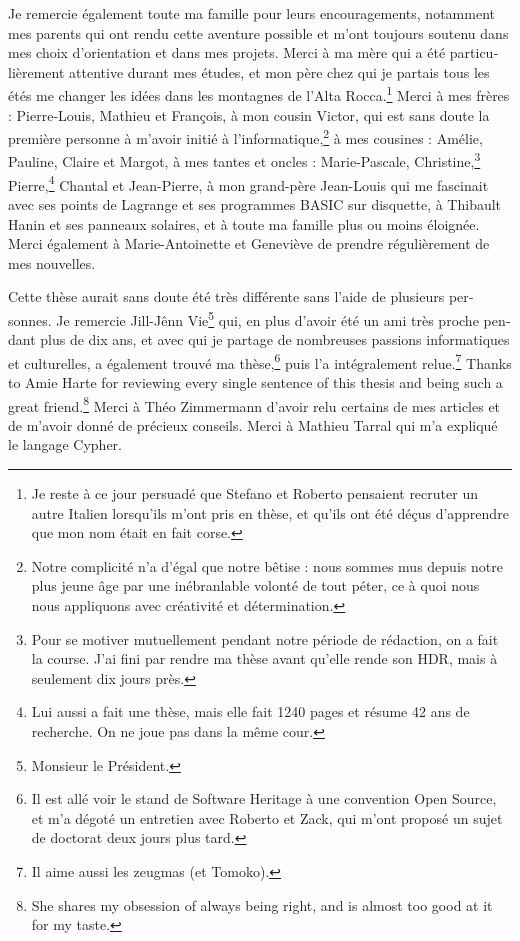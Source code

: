 \begin{otherlanguage}{french}
\begin{SingleSpace}
  Je remercie également toute ma famille pour leurs encouragements, notamment
  mes parents qui ont rendu cette aventure possible et m'ont toujours soutenu
  dans mes choix d'orientation et dans mes projets. Merci à ma mère qui a été
  particulièrement attentive durant mes études, et mon père chez qui je partais
  tous les étés me changer les idées dans les montagnes de l'Alta
  Rocca.\footnote{Je reste à ce jour persuadé que Stefano et Roberto pensaient
  recruter un autre Italien lorsqu'ils m'ont pris en thèse, et qu'ils ont été
  déçus d'apprendre que mon nom était en fait corse.}
  Merci à mes frères : Pierre-Louis, Mathieu et François,
  à mon cousin Victor,
  qui est sans doute la première personne à m'avoir initié à
  l'informatique,\footnote{Notre complicité n'a d'égal que notre bêtise : nous
  sommes mus depuis notre plus jeune âge par une inébranlable volonté de tout
  péter, ce à quoi nous nous appliquons avec créativité et détermination.}
  à mes cousines : Amélie, Pauline, Claire et Margot,
  à mes tantes et oncles : Marie-Pascale, Christine,\footnote{Pour
  se motiver mutuellement pendant notre période de rédaction, on a fait la
  course. J'ai fini par rendre ma thèse avant qu'elle rende son HDR, mais à
  seulement dix jours près.}
  Pierre,\footnote{Lui aussi a fait une thèse, mais elle fait 1240
  pages et résume 42 ans de recherche. On ne joue pas dans la même cour.}
  Chantal et Jean-Pierre, à mon grand-père Jean-Louis qui me fascinait
  avec ses points de Lagrange et ses programmes BASIC sur disquette, à Thibault
  Hanin et ses panneaux solaires, et à toute ma famille plus ou moins éloignée.
  Merci également à Marie-Antoinette et Geneviève de prendre régulièrement de
  mes nouvelles.

  Cette thèse aurait sans doute été très différente sans l'aide de plusieurs
  personnes. Je remercie Jill-Jênn Vie\footnote{Monsieur le Président.} qui, en
  plus d'avoir été un ami très proche pendant plus de dix ans, et avec qui je
  partage de nombreuses passions informatiques et culturelles, a également
  trouvé ma thèse,\footnote{Il est allé voir le stand de Software Heritage à
  une convention Open Source, et m'a dégoté un entretien avec Roberto et Zack,
  qui m'ont proposé un sujet de doctorat deux jours plus tard.} puis l'a
  intégralement relue.\footnote{Il aime aussi les zeugmas (et Tomoko).}
  Thanks to Amie Harte for reviewing every single sentence of this thesis and
  being such a great friend.\footnote{She shares my obsession of always being
  right, and is almost too good at it for my taste.} Merci à Théo Zimmermann
  d'avoir relu certains de mes articles et de m'avoir donné de précieux
  conseils. Merci à Mathieu Tarral qui m'a expliqué le langage Cypher.


\end{SingleSpace}
\end{otherlanguage}
